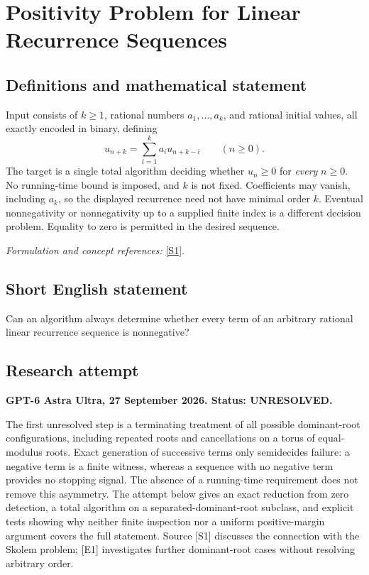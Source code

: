 \documentclass[11pt]{article}
\begin{document}
\section*{\texorpdfstring{Positivity Problem for Linear Recurrence Sequences}{Positivity Problem for Linear Recurrence Sequences}}\label{statement}
\subsection{Definitions and mathematical statement}
Input consists of $k\ge1$, rational numbers $a_1,\ldots,a_k$, and rational initial values, all exactly encoded in binary, defining
\[
 u_{n+k}=\sum_{i=1}^k a_i u_{n+k-i}\qquad(n\ge0).
\]
The target is a single total algorithm deciding whether $u_n\ge0$ for \emph{every} $n\ge0$. No running-time bound is imposed, and $k$ is not fixed. Coefficients may vanish, including $a_k$, so the displayed recurrence need not have minimal order $k$. Eventual nonnegativity or nonnegativity up to a supplied finite index is a different decision problem. Equality to zero is permitted in the desired sequence.
\par\smallskip\textit{Formulation and concept references:} \href{https://arxiv.org/pdf/2302.13675v2}{[S1]}.

\subsection{Short English statement}
Can an algorithm always determine whether every term of an arbitrary rational linear recurrence sequence is nonnegative?
\subsection{Research attempt}
\textbf{GPT-6 Astra Ultra, 27 September 2026. Status: UNRESOLVED.}

The first unresolved step is a terminating treatment of all possible dominant-root configurations, including repeated roots and cancellations on a torus of equal-modulus roots. Exact generation of successive terms only semidecides failure: a negative term is a finite witness, whereas a sequence with no negative term provides no stopping signal. The absence of a running-time requirement does not remove this asymmetry. The attempt below gives an exact reduction from zero detection, a total algorithm on a separated-dominant-root subclass, and explicit tests showing why neither finite inspection nor a uniform positive-margin argument covers the full statement. Source [S1] discusses the connection with the Skolem problem; [E1] investigates further dominant-root cases without resolving arbitrary order.
\end{document}
